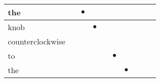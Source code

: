 \documentclass[landscape]{article}
\newcommand{\ssp}{\hspace{2pt}}
\newcommand{\mex}{\cellcolor{g}$\bullet$}
\begin{document}
\begin{tabular}{|l|p{10pt}|p{10pt}|p{10pt}|p{10pt}|p{10pt}|p{10pt}|p{10pt}|p{10pt}|p{10pt}|}
\hline
\ssp \cellcolor{ref1}the \ssp&\hspace{2pt}&\hspace{2pt}\mex&\hspace{2pt}&\hspace{2pt}&\hspace{2pt}&\hspace{2pt}&\hspace{2pt}&\hspace{2pt}&\hspace{2pt}\\
\hline
\ssp \cellcolor{ref2}knob \ssp&\hspace{2pt}&\hspace{2pt}&\hspace{2pt}\mex&\hspace{2pt}&\hspace{2pt}&\hspace{2pt}&\hspace{2pt}&\hspace{2pt}&\hspace{2pt}\\
\hline
\ssp counterclockwise \ssp&\hspace{2pt}&\hspace{2pt}&\hspace{2pt}&\hspace{2pt}&\hspace{2pt}&\hspace{2pt}&\hspace{2pt}&\hspace{2pt}&\hspace{2pt}\\
\hline
\ssp \cellcolor{ref4}to \ssp&\hspace{2pt}&\hspace{2pt}&\hspace{2pt}&\hspace{2pt}&\hspace{2pt}\mex&\hspace{2pt}&\hspace{2pt}&\hspace{2pt}&\hspace{2pt}\\
\hline
\ssp \cellcolor{ref5}the \ssp&\hspace{2pt}&\hspace{2pt}&\hspace{2pt}&\hspace{2pt}&\hspace{2pt}&\hspace{2pt}\mex&\hspace{2pt}&\hspace{2pt}&\hspace{2pt}\\

\end{tabular}
\end{document}
